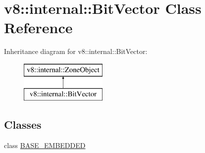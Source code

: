 \hypertarget{classv8_1_1internal_1_1_bit_vector}{}\section{v8\+:\+:internal\+:\+:Bit\+Vector Class Reference}
\label{classv8_1_1internal_1_1_bit_vector}
Inheritance diagram for v8\+:\+:internal\+:\+:Bit\+Vector\+:\begin{figure}[H]
\begin{center}
\leavevmode
\includegraphics[height=2.000000cm]{classv8_1_1internal_1_1_bit_vector}
\end{center}
\end{figure}
\subsection*{Classes}
\begin{DoxyCompactItemize}
\item 
class \hyperlink{classv8_1_1internal_1_1_bit_vector_1_1_b_a_s_e___e_m_b_e_d_d_e_d}{B\+A\+S\+E\+\_\+\+E\+M\+B\+E\+D\+D\+E\+D}
\end{DoxyCompactItemize}
